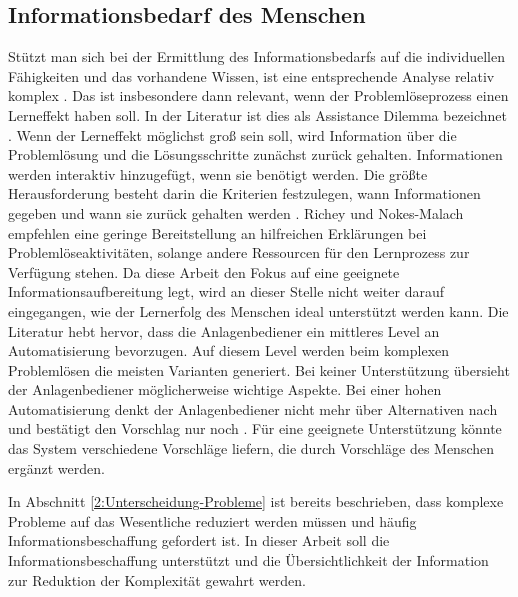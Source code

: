 \subsection{Informationsbedarf des Menschen}
\label{3:Informationsbedarf-Operator}
Stützt man sich bei der Ermittlung des Informationsbedarfs auf die individuellen Fähigkeiten und das vorhandene Wissen, ist eine entsprechende Analyse relativ komplex \cite{Richey2013}. Das ist insbesondere dann relevant, wenn der Problemlöseprozess einen Lerneffekt haben soll. In der Literatur ist dies als Assistance Dilemma bezeichnet \cite{Koedinger2007}. Wenn der Lerneffekt möglichst groß sein soll, wird Information über die Problemlösung und die Lösungsschritte zunächst zurück gehalten. Informationen werden interaktiv hinzugefügt, wenn sie benötigt werden. Die größte Herausforderung besteht darin die Kriterien festzulegen, wann Informationen gegeben und wann sie zurück gehalten werden \cite{Koedinger2007}.  Richey und Nokes-Malach \cite{Richey2013} empfehlen eine geringe Bereitstellung an hilfreichen Erklärungen bei Problemlöseaktivitäten, solange andere Ressourcen für den Lernprozess zur Verfügung stehen. Da diese Arbeit den Fokus auf eine geeignete Informationsaufbereitung legt, wird an dieser Stelle nicht weiter darauf eingegangen, wie der Lernerfolg des Menschen ideal unterstützt werden kann. Die Literatur \cite{Miller2005, Sauer2018} hebt hervor, dass die Anlagenbediener ein mittleres Level an Automatisierung bevorzugen. Auf diesem Level werden beim komplexen Problemlösen die meisten Varianten generiert. Bei keiner Unterstützung übersieht der Anlagenbediener möglicherweise wichtige Aspekte. Bei einer hohen Automatisierung denkt der Anlagenbediener nicht mehr über Alternativen nach und bestätigt den Vorschlag nur noch \cite{Miller2005}. Für eine geeignete Unterstützung könnte das System verschiedene Vorschläge liefern, die durch Vorschläge des Menschen ergänzt werden.

In Abschnitt \ref{2:Unterscheidung-Probleme} ist bereits beschrieben, dass komplexe Probleme auf das Wesentliche reduziert werden müssen und häufig Informationsbeschaffung gefordert ist. In dieser Arbeit soll die Informationsbeschaffung unterstützt und die Übersichtlichkeit der Information zur Reduktion der Komplexität gewahrt werden.

